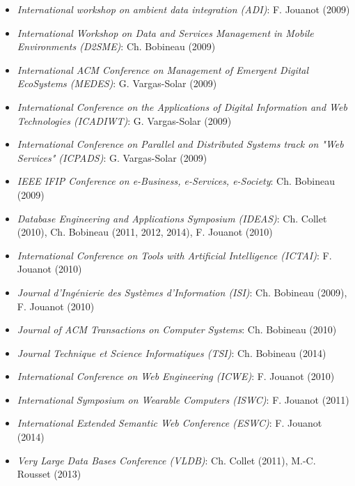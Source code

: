 \begin{itemize}
\item {\it International workshop on ambient data integration (ADI)}: F. Jouanot (2009)

\item {\it International Workshop on Data and Services Management in Mobile Environments (D2SME)}: Ch. Bobineau (2009)

\item {\it International ACM Conference on Management of Emergent Digital EcoSystems (MEDES)}: G. Vargas-Solar (2009)

\item {\it International Conference on the Applications of Digital Information and Web Technologies (ICADIWT)}: G. Vargas-Solar (2009)

\item {\it International Conference on Parallel and Distributed Systems  track on "Web Services" (ICPADS)}: G. Vargas-Solar (2009)

\item {\it IEEE IFIP Conference on e-Business, e-Services, e-Society}: Ch. Bobineau (2009)

\item {\it Database Engineering and Applications Symposium (IDEAS)}: Ch. Collet (2010), Ch. Bobineau (2011, 2012, 2014), F. Jouanot (2010)

\item {\it International Conference on Tools with Artificial Intelligence (ICTAI)}: F. Jouanot (2010)

\item {\it Journal d'Ing{\'e}nierie des Syst{\`e}mes d'Information (ISI)}: Ch. Bobineau (2009), F. Jouanot (2010)

\item {\it Journal of ACM Transactions on Computer Systems}: Ch. Bobineau (2010)

\item {\it Journal Technique et Science Informatiques (TSI)}: Ch. Bobineau (2014)

\item {\it International Conference on Web Engineering (ICWE)}: F. Jouanot (2010)

\item {\it International Symposium on Wearable Computers (ISWC)}: F. Jouanot (2011)

\item {\it International Extended Semantic Web Conference (ESWC)}: F. Jouanot (2014)

\item {\it Very Large Data Bases Conference (VLDB)}: Ch. Collet (2011), M.-C. Rousset (2013)


\end{itemize}
